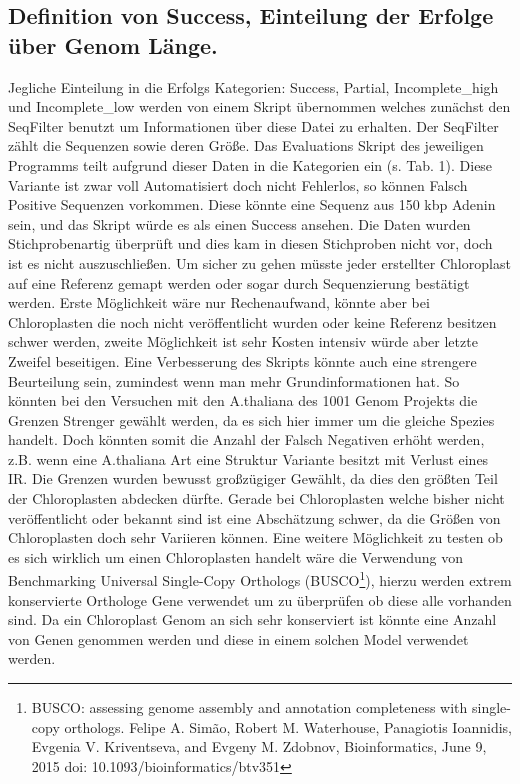 \documentclass{scrartcl}
\begin{document}
\subsection{Definition von Success, Einteilung der Erfolge über Genom Länge.}
\label{sec-5-1}
Jegliche Einteilung in die Erfolgs Kategorien: Success, Partial, Incomplete\_high und Incomplete\_low werden von einem Skript übernommen welches zunächst den SeqFilter benutzt um Informationen über diese Datei zu erhalten. 
Der SeqFilter zählt die Sequenzen sowie deren Größe. Das Evaluations Skript des jeweiligen Programms teilt aufgrund dieser Daten in die Kategorien ein (s. Tab. 1). Diese Variante ist zwar voll Automatisiert
doch nicht Fehlerlos, so können Falsch Positive Sequenzen vorkommen. Diese könnte eine Sequenz aus 150 kbp Adenin sein, und das Skript würde es als einen Success ansehen. Die Daten wurden Stichprobenartig überprüft und dies 
kam in diesen Stichproben nicht vor, doch ist es nicht auszuschließen. Um sicher zu gehen müsste jeder erstellter Chloroplast auf eine Referenz gemapt werden oder sogar durch Sequenzierung bestätigt werden. Erste Möglichkeit
wäre nur Rechenaufwand, könnte aber bei Chloroplasten die noch nicht veröffentlicht wurden oder keine Referenz besitzen schwer werden, zweite Möglichkeit ist sehr Kosten intensiv würde aber letzte Zweifel beseitigen. 
Eine Verbesserung des Skripts könnte auch eine strengere Beurteilung sein, zumindest wenn man mehr Grundinformationen hat. So könnten bei den Versuchen mit den A.thaliana des 1001 Genom Projekts die Grenzen Strenger gewählt werden, 
da es sich hier immer um die gleiche Spezies handelt. Doch könnten somit die Anzahl der Falsch Negativen erhöht werden, z.B. wenn eine A.thaliana Art eine Struktur Variante besitzt mit Verlust eines IR. Die Grenzen wurden 
bewusst großzügiger Gewählt, da dies den größten Teil der Chloroplasten abdecken dürfte. Gerade bei Chloroplasten welche bisher nicht veröffentlicht oder bekannt sind ist eine Abschätzung schwer, da die Größen von Chloroplasten
doch sehr Variieren können. Eine weitere Möglichkeit zu testen ob es sich wirklich um einen Chloroplasten handelt wäre die Verwendung von Benchmarking Universal Single-Copy Orthologs (BUSCO\footnote{BUSCO: assessing genome assembly and annotation completeness with single-copy orthologs. Felipe A. Simão, Robert M. Waterhouse, Panagiotis Ioannidis, Evgenia V. Kriventseva, and Evgeny M. Zdobnov, Bioinformatics, June 9, 2015 doi: 10.1093/bioinformatics/btv351}), hierzu werden extrem konservierte
Orthologe Gene verwendet um zu überprüfen ob diese alle vorhanden sind. Da ein Chloroplast Genom an sich sehr konserviert ist könnte eine Anzahl von Genen genommen werden und diese in einem solchen Model verwendet werden. 
\end{document}
